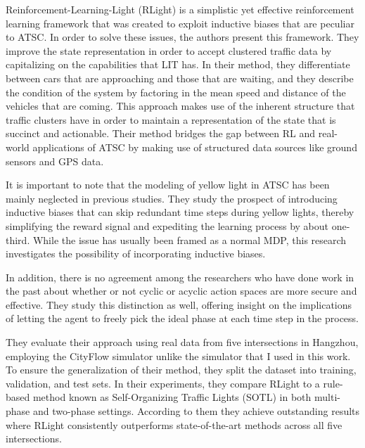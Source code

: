 Reinforcement-Learning-Light (RLight)\cite{kanis2021deep} is a simplistic yet effective reinforcement learning framework that was created to exploit inductive biases that are peculiar to ATSC. In order to solve these issues, the authors present this framework. They improve the state representation in order to accept clustered traffic data by capitalizing on the capabilities that LIT has. In their method, they differentiate between cars that are approaching and those that are waiting, and they describe the condition of the system by factoring in the mean speed and distance of the vehicles that are coming. This approach makes use of the inherent structure that traffic clusters have in order to maintain a representation of the state that is succinct and actionable. Their method bridges the gap between RL and real-world applications of ATSC by making use of structured data sources like ground sensors and GPS data.

It is important to note that the modeling of yellow light in ATSC has been mainly neglected in previous studies. They study the prospect of introducing inductive biases that can skip redundant time steps during yellow lights, thereby simplifying the reward signal and expediting the learning process by about one-third. While the issue has usually been framed as a normal MDP, this research investigates the possibility of incorporating inductive biases.

In addition, there is no agreement among the researchers who have done work in the past about whether or not cyclic or acyclic action spaces are more secure and effective. They study this distinction as well, offering insight on the implications of letting the agent to freely pick the ideal phase at each time step in the process.


They evaluate their approach using real data from five intersections in Hangzhou, employing the CityFlow simulator \cite{zhang2019cityflow} unlike the simulator that I used in this work. To ensure the generalization of their method, they split the dataset into training, validation, and test sets. In their experiments, they compare RLight to a rule-based method known as Self-Organizing Traffic Lights (SOTL) \cite{cools2008selforganizing} in both multi-phase and two-phase settings. According to them they achieve outstanding results where RLight consistently outperforms state-of-the-art methods across all five intersections.

